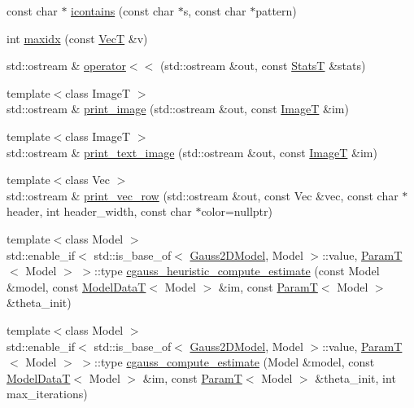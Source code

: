 \begin{DoxyCompactItemize}
\item 
const char $\ast$ \hyperlink{namespacemappel_aadd3347168b25dd7a097676d342e3ef8}{icontains} (const char $\ast$s, const char $\ast$pattern)
\item 
int \hyperlink{namespacemappel_abd020db8cce0baee03e09251e1a78e78}{maxidx} (const \hyperlink{namespacemappel_a2225ad69f358daa3f4f99282a35b9a3a}{VecT} \&v)
\item 
std\+::ostream \& \hyperlink{namespacemappel_ac61f8d2289377a38008fb499003a3893}{operator$<$$<$} (std\+::ostream \&out, const \hyperlink{namespacemappel_a04ab395b0cf82c4ce68a36b2212649a5}{StatsT} \&stats)
\item 
{\footnotesize template$<$class ImageT $>$ }\\std\+::ostream \& \hyperlink{namespacemappel_a3294759903a1265559b35bc4b487b75b}{print\+\_\+image} (std\+::ostream \&out, const \hyperlink{namespacemappel_a14658186b77757f3c35a69cb1be6cf4b}{ImageT} \&im)
\item 
{\footnotesize template$<$class ImageT $>$ }\\std\+::ostream \& \hyperlink{namespacemappel_a7001581f62e18f70a49f9b3e76bd0ac9}{print\+\_\+text\+\_\+image} (std\+::ostream \&out, const \hyperlink{namespacemappel_a14658186b77757f3c35a69cb1be6cf4b}{ImageT} \&im)
\item 
{\footnotesize template$<$class Vec $>$ }\\std\+::ostream \& \hyperlink{namespacemappel_adb38bc84f5b9500d9019091e80e7ada8}{print\+\_\+vec\+\_\+row} (std\+::ostream \&out, const Vec \&vec, const char $\ast$header, int header\+\_\+width, const char $\ast$color=nullptr)
\item 
{\footnotesize template$<$class Model $>$ }\\std\+::enable\+\_\+if$<$ std\+::is\+\_\+base\+\_\+of$<$ \hyperlink{classmappel_1_1Gauss2DModel}{Gauss2\+D\+Model}, Model $>$\+::value, \hyperlink{namespacemappel_a667925cb0d6c0e49f2f035cc5a9a6857}{ParamT}$<$ Model $>$ $>$\+::type \hyperlink{namespacemappel_a4f99d21dc5c7c014dfafa98883ce287b}{cgauss\+\_\+heuristic\+\_\+compute\+\_\+estimate} (const Model \&model, const \hyperlink{namespacemappel_a97f050df953605381ae9c901c3b125f1}{Model\+DataT}$<$ Model $>$ \&im, const \hyperlink{namespacemappel_a667925cb0d6c0e49f2f035cc5a9a6857}{ParamT}$<$ Model $>$ \&theta\+\_\+init)
\item 
{\footnotesize template$<$class Model $>$ }\\std\+::enable\+\_\+if$<$ std\+::is\+\_\+base\+\_\+of$<$ \hyperlink{classmappel_1_1Gauss2DModel}{Gauss2\+D\+Model}, Model $>$\+::value, \hyperlink{namespacemappel_a667925cb0d6c0e49f2f035cc5a9a6857}{ParamT}$<$ Model $>$ $>$\+::type \hyperlink{namespacemappel_a8e0442f3b44f3db95d6e656376f20a4c}{cgauss\+\_\+compute\+\_\+estimate} (Model \&model, const \hyperlink{namespacemappel_a97f050df953605381ae9c901c3b125f1}{Model\+DataT}$<$ Model $>$ \&im, const \hyperlink{namespacemappel_a667925cb0d6c0e49f2f035cc5a9a6857}{ParamT}$<$ Model $>$ \&theta\+\_\+init, int max\+\_\+iterations)

\end{DoxyCompactItemize}
